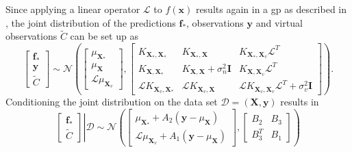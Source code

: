Since applying a linear operator $\mathcal{L}$ to $f(\mathbf{x})$ results again in a \gls{gp} as described in , the joint distribution of the predictions $\mathbf{f}_*$, observations $\mathbf{y}$ and virtual observations $\tilde{C}$ can be set up as
\begin{equation}
    \left[ \begin{array}{c}
    \mathbf{f_*} \\
    \mathbf{y}\\ 
    \tilde{C}
    \end{array}\right] \sim \mathcal{N} \left( \left[ \begin{array}{c}
    \mu_{\mathbf{X}_*}\\ 
    \mu_{\mathbf{X}} \\
    \mathcal{L}\mu_{\mathbf{X}_v}
    \end{array}\right],
    \left[\begin{array}{ccc}
    K_{\mathbf{X}_*,\mathbf{X}_*}& K_{\mathbf{X}_*,\mathbf{X}} & K_{\mathbf{X}_*,\mathbf{X}_v}\mathcal{L}^T \\ 
    K_{\mathbf{X},\mathbf{X}_*} & K_{\mathbf{X},\mathbf{X}} + \sigma_n^2\mathbf{I} & K_{\mathbf{X},\mathbf{X}_v}\mathcal{L}^T  \\
    \mathcal{L}K_{\mathbf{X}_v,\mathbf{X}_*} & \mathcal{L}K_{\mathbf{X}_v,\mathbf{X}} & \mathcal{L}K_{\mathbf{X}_v,\mathbf{X}_v}\mathcal{L}^T + \sigma_v^2\mathbf{I}
    \end{array}\right] \right).
    \label{eq:unconstrained_joint_distribution}
\end{equation}
Conditioning the joint distribution on the data set $\mathcal{D}=(\mathbf{X}, \mathbf{y})$ results in
\begin{equation}
    \left.\left[ \begin{array}{c}
    \mathbf{f_*} \\
    \tilde{C}
    \end{array}\right] \right\vert \mathcal{D} \sim \mathcal{N} \left( \left[ \begin{array}{c}
    \mu_{\mathbf{X}_*} + A_2 \left( \mathbf{y} - \mu_{\mathbf{X}}\right) \\ 
    \mathcal{L}\mu_{\mathbf{X}_v} + A_1 \left( \mathbf{y} - \mu_{\mathbf{X}}\right)
    \end{array}\right],
    \left[\begin{array}{cc}
    B_2 & B_3 \\
    B_3^T & B_1
    \end{array}\right] \right)
    \label{eq:unconstrained_joint_distribution2}
\end{equation}
